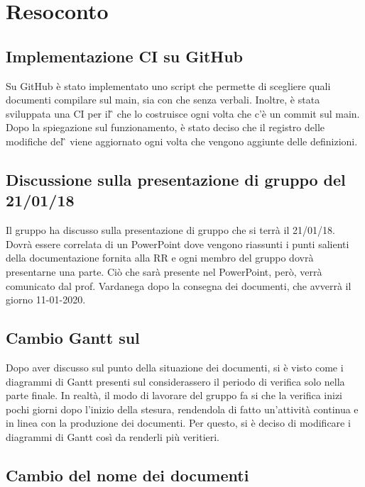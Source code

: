 \newpage


\section{Resoconto}

\subsection{Implementazione CI su GitHub}

Su GitHub è stato implementato uno script che permette di scegliere quali documenti compilare sul main, sia con che senza verbali. Inoltre, è stata sviluppata una CI per il \G{} che lo costruisce ogni volta che c'è un commit sul main. Dopo la spiegazione sul funzionamento, è stato deciso che il registro delle modifiche del \G{} viene aggiornato ogni volta che vengono aggiunte delle definizioni. 

\subsection{Discussione sulla presentazione di gruppo del 21/01/18}

Il gruppo ha discusso sulla presentazione di gruppo che si terrà il 21/01/18. Dovrà essere correlata di un PowerPoint dove vengono riassunti i punti salienti della documentazione fornita alla RR e ogni membro del gruppo dovrà presentarne una parte. Ciò che sarà presente nel PowerPoint, però, verrà comunicato dal prof. Vardanega dopo la consegna dei documenti, che avverrà il giorno 11-01-2020.

\subsection{Cambio Gantt sul \PdP{} }

Dopo aver discusso sul punto della situazione dei documenti, si è visto come i diagrammi di Gantt presenti sul \PdP{} considerassero il periodo di verifica solo nella parte finale. In realtà, il modo di lavorare del gruppo fa si che la verifica inizi pochi giorni dopo l'inizio della stesura, rendendola di fatto un'attività continua e in linea con la produzione dei documenti. Per questo, si è deciso di modificare i diagrammi di Gantt così da renderli più veritieri.

\subsection{Cambio del nome dei documenti}

